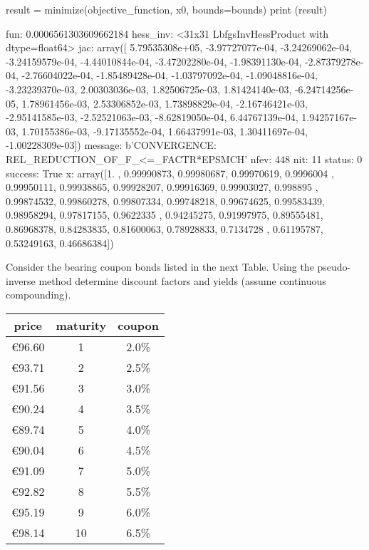 \begin{solution}
\begin{ipython}
result = minimize(objective_function, x0, bounds=bounds)
print (result)
\end{ipython}
\begin{ioutput}
     fun: 0.0006561303609662184
hess_inv: <31x31 LbfgsInvHessProduct with dtype=float64>
     jac: array([ 5.79535308e+05, -3.97727077e-04, -3.24269062e-04, -3.24159579e-04,
                 -4.44010844e-04, -3.47202280e-04, -1.98391130e-04, -2.87379278e-04,
                 -2.76604022e-04, -1.85489428e-04, -1.03797092e-04, -1.09048816e-04,
                 -3.23239370e-03,  2.00303036e-03,  1.82506725e-03,  1.81424140e-03,
                 -6.24714256e-05,  1.78961456e-03,  2.53306852e-03,  1.73898829e-04,
                 -2.16746421e-03, -2.95141585e-03, -2.52521063e-03, -8.62819050e-04,
                  6.44767139e-04,  1.94257167e-03,  1.70155386e-03, -9.17135552e-04,
                  1.66437991e-03,  1.30411697e-04, -1.00228309e-03])
 message: b'CONVERGENCE: REL_REDUCTION_OF_F_<=_FACTR*EPSMCH'
    nfev: 448
     nit: 11
  status: 0
 success: True
       x: array([1.        , 0.99990873, 0.99980687, 0.99970619, 0.9996004 ,
                 0.99950111, 0.99938865, 0.99928207, 0.99916369, 0.99903027,
                 0.998895  , 0.99874532, 0.99860278, 0.99807334, 0.99748218,
                 0.99674625, 0.99583439, 0.98958294, 0.97817155, 0.9622335 ,
                 0.94245275, 0.91997975, 0.89555481, 0.86968378, 0.84283835,
                 0.81600063, 0.78928833, 0.7134728 , 0.61195787, 0.53249163,
                 0.46686384])
\end{ioutput}
\end{solution}

\begin{question}
Consider the bearing coupon bonds listed in the next Table. Using the pseudo-inverse method determine discount factors and yields (assume continuous compounding).

\begin{table}[htb]
	\begin{center}
		\begin{tabular}{|c|c|c|}
			\hline
			\textbf{price} & \textbf{maturity} & \textbf{coupon} \\
			\hline
			\euro{96.60} & 1 & 2.0\% \\
			\hline
			\euro{93.71} & 2 & 2.5\% \\
			\hline
			\euro{91.56} & 3 & 3.0\% \\
			\hline
			\euro{90.24} & 4 & 3.5\% \\
			\hline
			\euro{89.74} & 5 & 4.0\% \\
			\hline
			\euro{90.04} & 6 & 4.5\% \\
			\hline
			\euro{91.09} & 7 & 5.0\% \\
			\hline
 			\euro{92.82} & 8 & 5.5\% \\
			\hline
			\euro{95.19} & 9 & 6.0\% \\
			\hline
			\euro{98.14} & 10 & 6.5\% \\
			\hline
		\end{tabular}
	\end{center}
\end{table}
	
\end{question}

